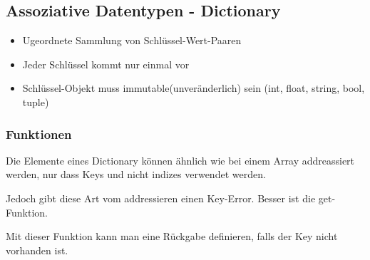 \subsection{Assoziative Datentypen - Dictionary}

\begin{itemize}
\item Ugeordnete Sammlung von Schlüssel-Wert-Paaren
\item Jeder Schlüssel kommt nur einmal vor
\item Schlüssel-Objekt muss immutable(unveränderlich) sein (int, float, string, bool, tuple)
\end{itemize}

\subsubsection{ Funktionen}
Die Elemente eines Dictionary können ähnlich wie bei einem Array addreassiert werden, nur dass Keys und nicht indizes verwendet werden.

Jedoch gibt diese Art vom addressieren einen Key-Error. Besser ist die get-Funktion.


Mit dieser Funktion kann man eine Rückgabe definieren, falls der Key nicht vorhanden ist.